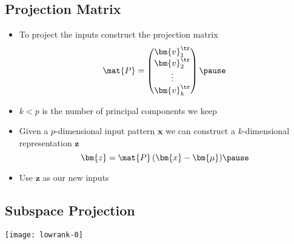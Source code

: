 
\begin{slide}
\section[-1]{Projection Matrix}

\begin{PauseHighLight}

\begin{itemize}\squeeze
\item To project the inputs construct the projection matrix
  \begin{displaymath}
    \mat{P} = 
    \begin{pmatrix}
      \bm{v}_1^\tr \\
      \bm{v}_2^\tr \\
      \vdots\\
      \bm{v}_k^\tr
    \end{pmatrix}\pause
  \end{displaymath}
\item $k<p$ is the number of principal components we keep\pause
\item Given a $p$-dimensional input pattern $\bm{x}$ we can construct a
  $k$-dimensional representation $\bm{z}$
  \begin{displaymath}
    \bm{z} = \mat{P} \, (\bm{x}-\bm{\mu})\pause
  \end{displaymath}
\item Use $\bm{z}$ as our new inputs\pause
\end{itemize}


\end{PauseHighLight}
\end{slide}

\begin{slide}
\section{Subspace Projection}
\pause
\pb
\begin{center}
  \texttt{[image: lowrank-0]}
\end{center}
\end{slide}

